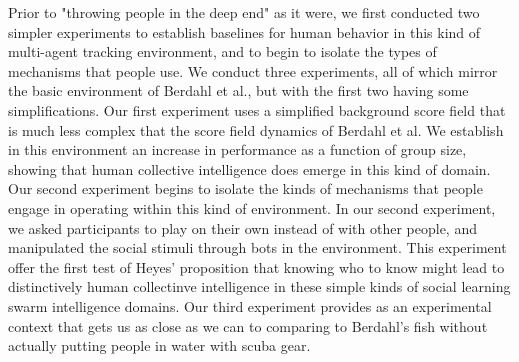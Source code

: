 \documentclass[12pt,letterpaper]{article}
\begin{document}
Prior to "throwing people in the deep end" as it were, we first conducted two simpler experiments to establish baselines for human behavior in this kind of multi-agent tracking environment, and to begin to isolate the types of mechanisms that people use.  We conduct three experiments, all of which mirror the basic environment of Berdahl et al., but with the first two having some simplifications. Our first experiment uses a simplified background score field that is much less complex that the score field dynamics of Berdahl et al.  We establish in this environment an increase in performance as a function of group size, showing that human collective intelligence does emerge in this kind of domain. Our second experiment begins to isolate the kinds of mechanisms that people engage in operating within this kind of environment.  In our second experiment, we asked participants to play on their own instead of with other people, and manipulated the social stimuli through bots in the environment.  This experiment offer the first test of Heyes' proposition that knowing who to know might lead to distinctively human collectinve intelligence in these simple kinds of social learning swarm intelligence domains.  Our third experiment provides as an experimental context that gets us as close as we can to comparing to Berdahl's fish without actually putting people in water with scuba gear. 
\end{document}
